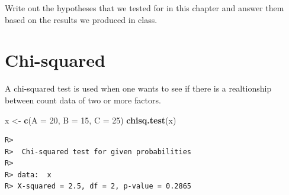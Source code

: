 \documentclass[english,10pt,a4paper,oneside]{book}
\newenvironment{Shaded}{\begin{snugshade}}{\end{snugshade}}
\newcommand{\KeywordTok}[1]{\textcolor[rgb]{0.13,0.29,0.53}{\textbf{#1}}}
\newcommand{\DataTypeTok}[1]{\textcolor[rgb]{0.13,0.29,0.53}{#1}}
\newcommand{\DecValTok}[1]{\textcolor[rgb]{0.00,0.00,0.81}{#1}}
\newcommand{\StringTok}[1]{\textcolor[rgb]{0.31,0.60,0.02}{#1}}
\newcommand{\NormalTok}[1]{#1}
\theoremstyle{definition}
\theoremstyle{definition}
\theoremstyle{definition}
\theoremstyle{remark}
\begin{document}
Write out the hypotheses that we tested for in this chapter and answer
them based on the results we produced in class.

\chapter{Chi-squared}\label{chi-squared}

A chi-squared test is used when one wants to see if there is a
realtionship between count data of two or more factors.

\begin{Shaded}
\begin{Highlighting}[]
\NormalTok{x <-}\StringTok{ }\KeywordTok{c}\NormalTok{(}\DataTypeTok{A =} \DecValTok{20}\NormalTok{, }\DataTypeTok{B =} \DecValTok{15}\NormalTok{, }\DataTypeTok{C =} \DecValTok{25}\NormalTok{)}
\KeywordTok{chisq.test}\NormalTok{(x)}
\end{Highlighting}
\end{Shaded}

\begin{verbatim}
R> 
R>  Chi-squared test for given probabilities
R> 
R> data:  x
R> X-squared = 2.5, df = 2, p-value = 0.2865
\end{verbatim}


\end{document}
